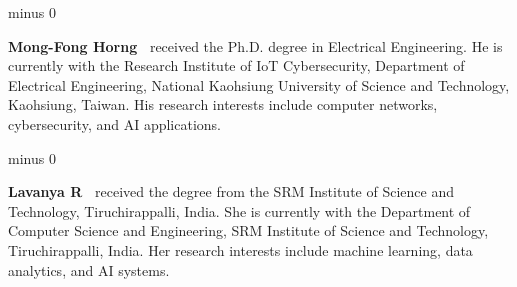\documentclass{ieeeaccess}
\makeatletter
\theoremstyle{definition}
\theoremstyle{plain}
\renewenvironment{IEEEbiographynophoto}[1]{%
  \normalfont\@IEEEcompsoconly{\sffamily}\footnotesize\interlinepenalty500%
  \vskip 1\baselineskip minus 0\baselineskip%
  \parskip=0pt\par%
  \noindent\textbf{#1\ }\@IEEEgobbleleadPARNLSP}{\relax\par\normalfont}
\makeatother
\begin{document}
\begin{IEEEbiographynophoto}{Mong-Fong Horng}
received the Ph.D. degree in Electrical Engineering. He is currently with the Research Institute of IoT Cybersecurity, Department of Electrical Engineering, National Kaohsiung University of Science and Technology, Kaohsiung, Taiwan. His research interests include computer networks, cybersecurity, and AI applications.
\end{IEEEbiographynophoto}

\begin{IEEEbiographynophoto}{Lavanya R}
received the degree from the SRM Institute of Science and Technology, Tiruchirappalli, India. She is currently with the Department of Computer Science and Engineering, SRM Institute of Science and Technology, Tiruchirappalli, India. Her research interests include machine learning, data analytics, and AI systems.
\end{IEEEbiographynophoto}



\EOD
\end{document}
